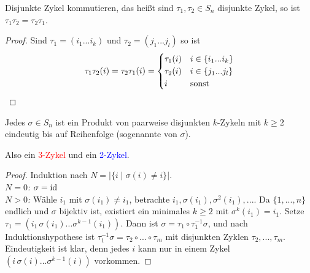 \begin{lemma}
	Disjunkte Zykel kommutieren, das heißt sind $\tau_1,\tau_2\in S_n$ disjunkte Zykel, so ist $\tau_1\tau_2 = \tau_2\tau_1$.
\end{lemma}
\begin{proof}
	Sind $\tau_1=(i_1...i_k)$ und $\tau_2=(j_1...j_l)$ so ist
	\begin{align}
		\tau_1\tau_2(i)=\tau_2\tau_1(i)=\begin{cases}
			\tau_1(i) & i\in\{i_1...i_k\} \\
			\tau_2(i) & i\in\{j_1...j_l\} \\
			i & \text{sonst}
		\end{cases}\notag
	\end{align}
\end{proof}

\begin{proposition}
	Jedes $\sigma\in S_n$ ist ein Produkt von paarweise disjunkten $k$-Zykeln mit $k\ge 2$ eindeutig bis auf Reihenfolge (sogenannte  von $\sigma$). 
	\begin{center}
	\end{center}
	Also ein \textcolor{red}{3-Zykel} und ein \textcolor{blue}{2-Zykel}.
\end{proposition}
\begin{proof}
	Induktion nach $N=\vert \{i\mid \sigma(i)\neq i\}\vert$. \\
	\emph{$N=0$:} $\sigma=\operatorname{id}$ \\
	\emph{$N>0$:} Wähle $i_1$ mit $\sigma(i_1)\neq i_1$, betrachte $i_1,\sigma(i_1),\sigma^2(i_1),...$. Da $\{1,...,n\}$ endlich und $\sigma$ bijektiv ist, existiert ein minimales $k\ge 2$ mit $\sigma^k(i_1)=i_1$. Setze $\tau_1=(i_1\,\sigma(i_1)...\sigma^{k-1}(i_1))$. Dann ist $\sigma=\tau_1\circ\tau_1^{-1}\sigma$, und nach Induktionshypothese ist $\tau_1^{-1}\sigma=\tau_2\circ...\circ\tau_m$ mit disjunkten Zyklen $\tau_2,...,\tau_m$. \\
	Eindeutigkeit ist klar, denn jedes $i$ kann nur in einem Zykel $(i\,\sigma(i)...\sigma^{k-1}(i))$ vorkommen.
\end{proof}